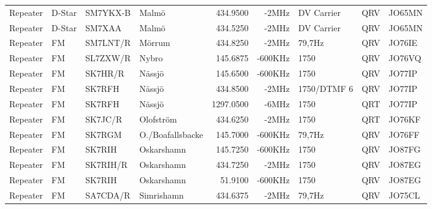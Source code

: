 \begin{landscape}
\begin{longtable}{llllrrlcl}
	Repeater          & D-Star       & SM7YKX-B      & Malmö               &          434.9500 &          -2MHz & DV Carrier      &       QRV       & JO65MN           \\
	Repeater          & D-Star       & SM7XAA        & Malmö               &          434.5250 &          -2MHz & DV Carrier      &       QRV       & JO65MN           \\
	Repeater          & FM           & SM7LNT/R      & Mörrum              &          434.8250 &          -2MHz & 79,7Hz          &       QRV       & JO76IE           \\
	Repeater          & FM           & SL7ZXW/R      & Nybro               &          145.6875 &        -600KHz & 1750            &       QRV       & JO76VQ           \\
	Repeater          & FM           & SK7HR/R       & Nässjö              &          145.6500 &        -600KHz & 1750            &       QRV       & JO77IP           \\
	Repeater          & FM           & SK7RFH        & Nässjö              &          434.8500 &          -2MHz & 1750/DTMF 6     &       QRV       & JO77IP           \\
	Repeater          & FM           & SK7RFH        & Nässjö              &         1297.0500 &          -6MHz & 1750            &       QRT       & JO77IP           \\
	Repeater          & FM           & SK7JC/R       & Olofström           &          434.6250 &          -2MHz & 1750            &       QRT       & JO76KF           \\
	Repeater          & FM           & SK7RGM        & O./Boafallsbacke    &          145.7000 &        -600KHz & 79,7Hz          &       QRV       & JO76FF           \\
	Repeater          & FM           & SK7RIH        & Oskarshamn          &          145.7250 &        -600KHz & 1750            &       QRV       & JO87FG           \\
	Repeater          & FM           & SK7RIH/R      & Oskarshamn          &          434.7250 &          -2MHz & 1750            &       QRV       & JO87EG           \\
	Repeater          & FM           & SK7RIH        & Oskarshamn          &           51.9100 &        -600KHz & 1750            &       QRV       & JO87EG           \\
	Repeater          & FM           & SA7CDA/R      & Simrishamn          &          434.6375 &          -2MHz & 79,7Hz          &       QRV       & JO75CL           \\

\end{longtable}
\end{landscape}
